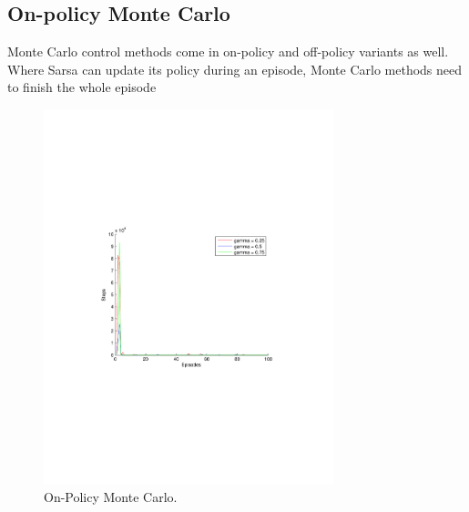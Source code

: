 \documentclass[a4paper,11pt]{article}
\begin{document}
\subsection*{On-policy Monte Carlo}
Monte Carlo control methods come in on-policy and off-policy variants as well.  Where Sarsa can update its policy during an episode, Monte Carlo methods need to finish the whole episode
~
\begin{figure}[t!]
  \centering
    \includegraphics[trim=4cm 8.5cm 4cm 8.5cm,clip,width=0.75\textwidth]{figures/onmc.pdf}
    \caption{On-Policy Monte Carlo.}
     \label{onmc}
\end{figure}
\newpage
\end{document}
